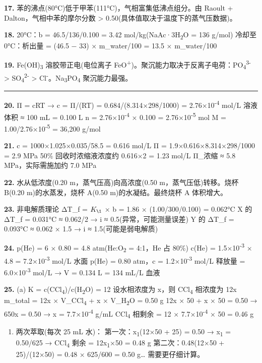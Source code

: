 \textbf{17.} 苯的沸点(80°C)低于甲苯(111°C)，气相富集低沸点组分。由 Raoult + Dalton，气相中苯的摩尔分数 \textgreater{} 0.50(具体值取决于温度下的蒸气压数据)。

\textbf{18.} 20°C：b = 46.5/136/0.100 = 3.42 mol/kg(NaAc·3H\textsubscript{2}O = 136 g/mol)
冷却至 0°C：析出量 = (46.5 − 33) × m\_water/100 = 13.5 × m\_water/100

\textbf{19.} Fe(OH)\textsubscript{3} 溶胶带正电(电位离子 FeO\textsuperscript{+})。聚沉能力取决于反离子电荷：PO\textsubscript{4}\textsuperscript{3-} \textgreater{} SO\textsubscript{4}\textsuperscript{2-} \textgreater{} Cl\textsuperscript{-}。Na\textsubscript{3}PO\textsubscript{4} 聚沉能力最强。

\begin{center}\rule{0.5\linewidth}{0.5pt}\end{center}

\textbf{20.} Π = cRT → c = Π/(RT) = 0.684/(8.314×298/1000) = 2.76×10\textsuperscript{-4} mol/L
溶液体积 ≈ 100 mL = 0.100 L
n = 2.76×10\textsuperscript{-4} × 0.100 = 2.76×10\textsuperscript{-5} mol
M = 1.00/2.76×10\textsuperscript{-5} = 36,200 g/mol

\textbf{21.} c = 1000×1.025×0.035/58.5 = 0.616 mol/L
Π = 1.9×0.616×8.314×298/1000 = 2.9 MPa
50\% 回收时浓缩液浓度约 0.616×2 = 1.23 mol/L
Π\_浓缩 ≈ 5.8 MPa，实际需施加约 7.0 MPa

\textbf{22.} 水从低浓度(0.20 m，蒸气压高)向高浓度(0.50 m，蒸气压低)转移。烧杯 B(0.20 m)的水蒸发，烧杯 A(0.50 m)的水凝结。最终烧杯 A 体积增大。

\textbf{23.} 非电解质理论 ΔT\_f = \(K_{\1}\) × b = 1.86 × (1.00/300/0.100) = 0.062°C
X 的 ΔT\_f = 0.031°C ≈ 0.062/2 → i ≈ 0.5(异常，可能测量误差)
Y 的 ΔT\_f = 0.093°C ≈ 0.062 × 1.5 → i ≈ 1.5(可能是弱电解质)

\textbf{24.} p(He) = 6 × 0.80 = 4.8 atm(He:O\textsubscript{2} = 4:1，He 占 80\%)
c(He) = 1.5×10\textsuperscript{-3} × 4.8 = 7.2×10\textsuperscript{-3} mol/L
水面 p(He) = 0.80 atm，c = 1.2×10\textsuperscript{-3} mol/L
释放量 = 6.0×10\textsuperscript{-3} mol/L → V = 0.134 L = 134 mL/L 血液

\textbf{25.}
(a) K = c(CCl\textsubscript{4})/c(H\textsubscript{2}O) = 12
设水相浓度为 x，则 CCl\textsubscript{4} 相浓度为 12x
m\_total = 12x × V\_CCl\textsubscript{4} + x × V\_H\textsubscript{2}O = 0.50 g
12x × 50 + x × 50 = 0.50 → 650x = 0.50 → x = 7.7×10\textsuperscript{-4} g/mL
CCl\textsubscript{4} 相剩余 = 12 × 7.7×10\textsuperscript{-4} × 50 = 0.46 g

\begin{enumerate}
\def\labelenumi{(\alph{enumi})}
\setcounter{enumi}{1}
\tightlist
\item
  两次萃取(每次 25 mL 水)：
  第一次：x\textsubscript{1}(12×50 + 25) = 0.50 → x\textsubscript{1} = 0.50/625 → CCl\textsubscript{4} 剩余 = 12x\textsubscript{1}×50 = 0.48 g
  第二次：0.48(12×50 + 25)/(12×50) = 0.48 × 625/600 = 0.50 g\ldots{} 需要更仔细计算。
\end{enumerate}

